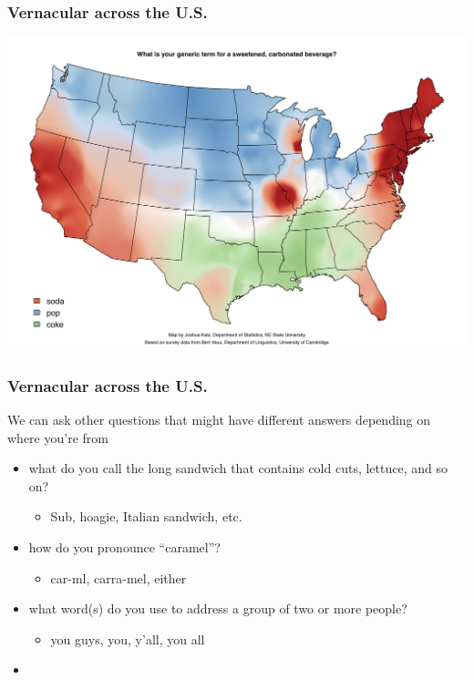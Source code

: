 \documentclass{beamer} %
\newcommand{\1}{\mathbb{1}}
\begin{document}
\begin{frame}[t]\frametitle{Vernacular across the U.S.}
\includegraphics[scale = 0.4]{./visualization/sodapopcoke.png}
\end{frame}

\begin{frame}[t]\frametitle{Vernacular across the U.S.}
We can ask other questions that might have different answers depending on where you're from
\begin{itemize}
	\item  what do you call the long sandwich that contains cold cuts, lettuce, and so on?
	\begin{itemize}
		\item Sub, hoagie, Italian sandwich, etc.
	\end{itemize}
	\item how do you pronounce ``caramel''?
	\begin{itemize}
		\item car-ml, carra-mel, either
	\end{itemize}	
	\item what word(s) do you use to address a group of two or more people?
	\begin{itemize}
		\item you guys, you, y'all, you all
	\end{itemize}	
	\item[]
\end{itemize}
\href{http://www4.uwm.edu/FLL/linguistics/dialect/maps.html}{}

\end{frame}
\end{document}
